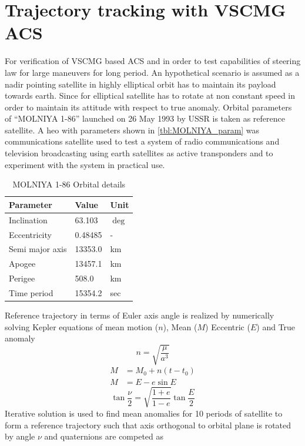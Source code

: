 \section{Trajectory tracking with VSCMG ACS}
For verification of VSCMG based ACS and in order to test capabilities of steering law for large maneuvers for long period. An hypothetical scenario is assumed as a nadir pointing satellite in highly elliptical orbit has to maintain its payload towards earth. Since for elliptical satellite has to rotate at non constant speed in order to maintain its attitude with respect to true anomaly.
Orbital parameters of ``MOLNIYA 1-86'' launched on 26 May 1993 by USSR is taken as reference satellite. A \acrlong{heo} with parameters shown in \autoref{tbl:MOLNIYA_param} was communications satellite used to test  a system of radio communications and television broadcasting using earth satellites as active transponders and to experiment with the system in practical use.\cite{Molniya}
\begin{table}[!h]
\centering
\begin{tabular}{p{}|p{}|p{}}
\toprule
 Parameter & Value & Unit \\
\midrule
 Inclination & 63.103 & $\displaystyle \deg$ \\
\hline 
 Eccentricity & 0.48485 & - \\
\hline 
 Semi major axis & 13353.0 & km \\
\hline 
 Apogee & 13457.1 & km \\
\hline 
 Perigee & 508.0 & km \\
\hline 
 Time period & 15354.2 & sec \\
 \bottomrule
\end{tabular}
\caption{MOLNIYA 1-86 Orbital details}
\label{tbl:MOLNIYA_param}
\end{table}

Reference trajectory in terms of Euler axis angle is realized by numerically solving Kepler equations of mean motion ($n$), Mean ($M$) Eccentric ($E$) and True anomaly
\begin{equation}
n=\sqrt{\frac{\mu }{a^{3}}}
\end{equation}
\begin{equation}
\begin{aligned}
M & =M_{0} +n( t-t_{0})\\
M & =E-e\sin E
\end{aligned}
\end{equation}
\begin{equation}
\tan\frac{\nu }{2} =\sqrt{\frac{1+e}{1-e}}\tan\frac{E}{2}
\end{equation}
Iterative solution is used to find mean anomalies for 10 periods of satellite to form a reference trajectory such that axis orthogonal to orbital plane is rotated by angle $\nu$ and quaternions are competed as

